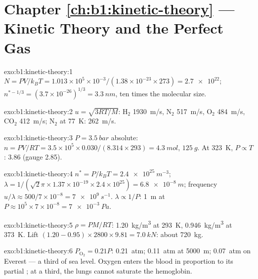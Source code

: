 \section*{Chapter \ref{ch:b1:kinetic-theory} --- Kinetic Theory and the Perfect Gas}

\begin{solution}{exo:b1:kinetic-theory:1}
$N = PV/k_BT = 1.013\times10^5 \times 10^{-3}/(1.38\times10^{-23} \times 273) =
\num{2.7e22}$; $n^{*-1/3} = (3.7\times10^{-26})^{1/3} = \qty{3.3}{nm}$, ten
times the molecular size.
\end{solution}

\begin{solution}{exo:b1:kinetic-theory:2}
$u = \sqrt{3RT/M}$: H$_2$ \qty{1930}{m/s}, N$_2$ \qty{517}{m/s}, O$_2$
\qty{484}{m/s}, CO$_2$ \qty{412}{m/s}; N$_2$ at \qty{77}{K}: \qty{262}{m/s}.
\end{solution}

\begin{solution}{exo:b1:kinetic-theory:3}
$P = \qty{3.5}{bar}$ absolute: $n = PV/RT = 3.5\times10^5 \times 0.030/(8.314
\times 293) = \qty{4.3}{mol}$, $\qty{125}{g}$. At \qty{323}{K}, $P \propto T$:
\qty{3.86}{} (gauge \qty{2.85}{}).
\end{solution}

\begin{solution}{exo:b1:kinetic-theory:4}
$n^* = P/k_BT = \qty{2.4e25}{m^{-3}}$; $\lambda = 1/(\sqrt2\pi \times 1.37\times
10^{-19} \times 2.4\times10^{25}) = \qty{6.8e-8}{m}$; frequency $u/\lambda \approx
500/7\times10^{-8} = \qty{7e9}{s^{-1}}$. $\lambda \propto 1/P$: \qty{1}{m} at
$P \approx 10^5 \times 7\times10^{-8} = \qty{7e-3}{Pa}$.
\end{solution}

\begin{solution}{exo:b1:kinetic-theory:5}
$\rho = PM/RT$: \qty{1.20}{kg/m^3} at \qty{293}{K}, \qty{0.946}{kg/m^3} at
\qty{373}{K}. Lift $(1.20 - 0.95) \times 2800 \times 9.81 = \qty{7.0}{kN}$:
about \qty{720}{kg}.
\end{solution}

\begin{solution}{exo:b1:kinetic-theory:6}
$P_{\mathrm{O}_2} = 0.21P$: \qty{0.21}{atm}; \qty{0.11}{atm} at \qty{5000}{m};
\qty{0.07}{atm} on Everest --- a third of sea level. Oxygen enters the
blood in proportion to its partial ; at a third, the lungs
cannot saturate the hemoglobin.
\end{solution}

